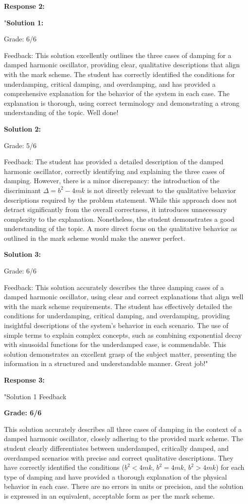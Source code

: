 \documentclass[a4paper,11pt]{article}
\begin{document}
\textbf{Response 2:}

"\textbf{Solution 1:}

Grade: 6/6

Feedback: This solution excellently outlines the three cases of damping for a damped harmonic oscillator, providing clear, qualitative descriptions that align with the mark scheme. The student has correctly identified the conditions for underdamping, critical damping, and overdamping, and has provided a comprehensive explanation for the behavior of the system in each case. The explanation is thorough, using correct terminology and demonstrating a strong understanding of the topic. Well done!

\textbf{Solution 2:}

Grade: 5/6

Feedback: The student has provided a detailed description of the damped harmonic oscillator, correctly identifying and explaining the three cases of damping. However, there is a minor discrepancy: the introduction of the discriminant \(\Delta = b^2 - 4mk\) is not directly relevant to the qualitative behavior descriptions required by the problem statement. While this approach does not detract significantly from the overall correctness, it introduces unnecessary complexity to the explanation. Nonetheless, the student demonstrates a good understanding of the topic. A more direct focus on the qualitative behavior as outlined in the mark scheme would make the answer perfect.

\textbf{Solution 3:}

Grade: 6/6

Feedback: This solution accurately describes the three damping cases of a damped harmonic oscillator, using clear and correct explanations that align well with the mark scheme requirements. The student has effectively detailed the conditions for underdamping, critical damping, and overdamping, providing insightful descriptions of the system's behavior in each scenario. The use of simple terms to explain complex concepts, such as combining exponential decay with sinusoidal functions for the underdamped case, is commendable. This solution demonstrates an excellent grasp of the subject matter, presenting the information in a structured and understandable manner. Great job!"

\textbf{Response 3:}

"Solution 1 Feedback

\textbf{Grade: 6/6}

This solution accurately describes all three cases of damping in the context of a damped harmonic oscillator, closely adhering to the provided mark scheme. The student clearly differentiates between underdamped, critically damped, and overdamped scenarios with precise and correct qualitative descriptions. They have correctly identified the conditions (\(b^2 < 4mk\), \(b^2 = 4mk\), \(b^2 > 4mk\)) for each type of damping and have provided a thorough explanation of the physical behavior in each case. There are no errors in units or precision, and the solution is expressed in an equivalent, acceptable form as per the mark scheme.
\end{document}
